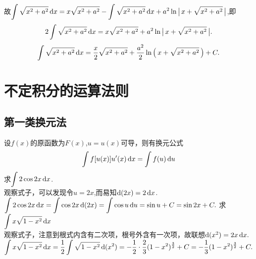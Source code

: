 故$\displaystyle\int\sqrt{x^2+a^2} \,{\rm{d}} x=x\sqrt{x^2+a^2}-\int\sqrt{x^2+a^2} \,{\rm{d}} x+a^2\ln\big|\, x+\sqrt{x^2+a^2}\,\big|$,即
\begin{equation}
	\nonumber
	2\int\sqrt{x^2+a^2} \,{\rm{d}} x=x\sqrt{x^2+a^2}+a^2\ln\big|\, x+\sqrt{x^2+a^2}\,\big|.
\end{equation}
\begin{equation}
	\nonumber
	\int \sqrt{x^2+a^2} \,{\rm{d}} x=\frac{x}{2}\sqrt{x^2+a^2}+\frac{a^2}{2}\ln\left( \, x+\sqrt{x^2+a^2}\,\right)+C.
\end{equation}
\section{不定积分的运算法则}
\label{sec:1}
\subsection{第一类换元法}
\theorem[第一类换元法]
 设$f(x)$的原函数为$F(x)$,$u=u(x)$可导，则有换元公式
\begin{equation}
	\int f[u(x)]u'(x) \,{\rm{d}} x=\int f(u) \,{\rm{d}} u
\end{equation}
\vspace{1em}
\examples 求$\displaystyle\int 2\cos 2x \, {\rm{d}} x$.\\
\solvereason 观察式子，可以发现令$u=2x$,而易知${\rm{d}}(2x)=2 \,{\rm{d}} x$.\\
\solve $\displaystyle\int 2\cos 2x \,{\rm{d}} x=\int \cos 2x \,{\rm{d}}(2x)=\int \cos u \,{\rm{d}} u=\sin u+C=\sin 2x+C.$\sj
\warn[\kg 在普通的积分式中通常有一个隐含条件:$(x)'=1$,有时候这是构造的关键，就像本题应完整写为：
\begin{equation}
	\nonumber
	\int 2\cos 2x \,\d x=\int \cos 2x(2x)' \,\d x=\int \cos 2x \,\d(2x)=\int \cos u \,\d u=\sin u+C=\sin 2x+C.
	\end{equation}
但因为书写的简洁性与方便性，可以省略$(x)'=1$的步骤，$(x)'=1$的更多应用见第二类换元法。]
\examples 求$\displaystyle\int x\sqrt{1-x^2} \,{\rm{d}} x$\\
\solvereason 观察式子，注意到根式内含有二次项，根号外含有一次项，故联想${\rm{d}}(x^2)=2x \,{\rm{d}} x.$\\
\solve $\displaystyle\int x\sqrt{1-x^2} \,{\rm{d}} x=\frac{1}{2}\int \sqrt{1-x^2} \,{\rm{d}}(x^2)=-\frac{1}{2}\cdot\frac{2}{3}(1-x^2)^{\frac{3}{2}}+C=-\frac{1}{3}(1-x^2)^{\frac{3}{2}}+C.$\sj
{}
